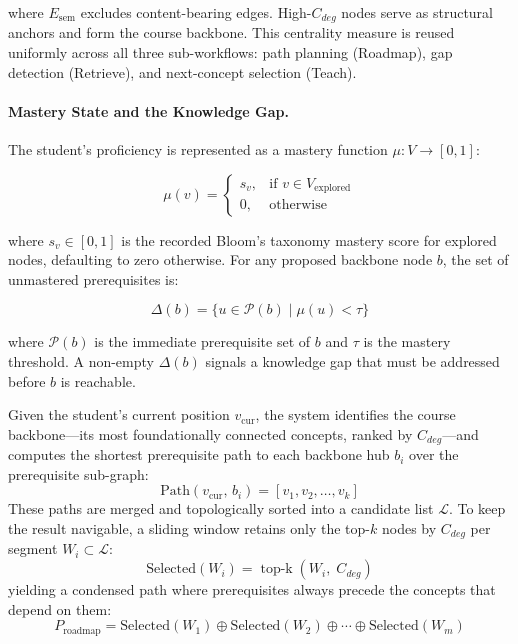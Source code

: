 where \(E_{\mathrm{sem}}\) excludes content-bearing edges. High-\(C_{deg}\) nodes serve as structural anchors and form the course backbone. 
This centrality measure is reused uniformly across all three sub-workflows: path planning (Roadmap), gap detection (Retrieve), and next-concept selection (Teach).

\paragraph*{Mastery State and the Knowledge Gap.}

The student's proficiency is represented as a  {mastery function} \(\mu : V \rightarrow [0, 1]\):

\begin{equation}
    \mu(v) =
    \begin{cases}
        s_v, & \text{if } v \in V_{\mathrm{explored}} \\
        0,   & \text{otherwise}
    \end{cases}
\end{equation}

where \(s_v \in [0,1]\) is the recorded Bloom's taxonomy mastery score for explored nodes, defaulting to zero otherwise. For any proposed backbone node \(b\), the set of unmastered prerequisites is:

\begin{equation}
    \Delta(b) = \{ u \in \mathcal{P}(b) \mid \mu(u) < \tau \}
\end{equation}

where \(\mathcal{P}(b)\) is the immediate prerequisite set of \(b\) and \(\tau\) is the mastery threshold. A non-empty \(\Delta(b)\) signals a knowledge gap that must be addressed before \(b\) is reachable.



Given the student's current position $v_{\mathrm{cur}}$, the system identifies the course backbone---its most foundationally connected concepts, ranked by $C_{deg}$---and computes the shortest prerequisite path to each backbone hub $b_i$ over the prerequisite sub-graph:
\begin{equation}
    \mathrm{Path}(v_{\mathrm{cur}},\, b_i) = [v_1, v_2, \ldots, v_k]
\end{equation}
These paths are merged and topologically sorted into a candidate list $\mathcal{L}$. To keep the result navigable, a sliding window retains only the top-$k$ nodes by $C_{deg}$ per segment $W_i \subset \mathcal{L}$:
\begin{equation}
    \mathrm{Selected}(W_i) = \operatorname{top\text{-}k}(W_i,\; C_{deg})
\end{equation}
yielding a condensed path where prerequisites always precede the concepts that depend on them:
\begin{equation}
    P_{\mathrm{roadmap}} = \mathrm{Selected}(W_1) \oplus \mathrm{Selected}(W_2) \oplus \cdots \oplus \mathrm{Selected}(W_m)
\end{equation}

